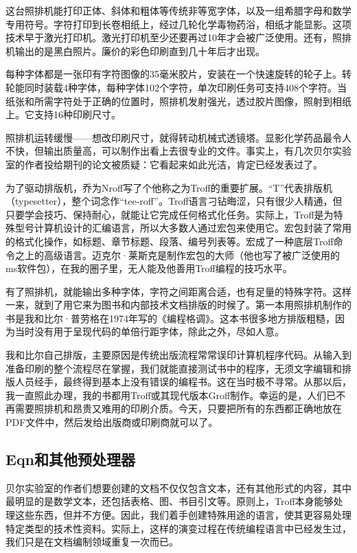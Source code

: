 \documentclass[a4paper,12pt,UTF8,twoside]{ctexbook}
\begin{document}
这台照排机能打印正体、斜体和粗体等传统非等宽字体，以及一组希腊字母和数学专用符号。字符打印到长卷相纸上，经过几轮化学毒物药浴，相纸才能显影。这项技术早于激光打印机。激光打印机至少还要再过10年才会被广泛使用。还有，照排机输出的是黑白照片。廉价的彩色印刷直到几十年后才出现。

每种字体都是一张印有字符图像的35毫米胶片，安装在一个快速旋转的轮子上。转轮能同时装载4种字体，每种字体102个字符，单次印刷任务可支持408个字符。当纸张和所需字符处于正确的位置时，照排机发射强光，透过胶片图像，照射到相纸上。它支持16种印刷尺寸。

照排机运转缓慢——想改印刷尺寸，就得转动机械式透镜塔。显影化学药品最令人不快，但输出质量高，可以制作出看上去很专业的文件。事实上，有几次贝尔实验室的作者投给期刊的论文被质疑：它看起来如此光洁，肯定已经发表过了。

为了驱动排版机，乔为Nroff写了个他称之为Troff的重要扩展。“T”代表排版机（typesetter），整个词念作“tee-roff”。Troff语言刁钻晦涩，只有很少人精通，但只要学会技巧、保持耐心，就能让它完成任何格式化任务。实际上，Troff是为特殊型号计算机设计的汇编语言，所以大多数人通过宏包来使用它。宏包封装了常用的格式化操作，如标题、章节标题、段落、编号列表等。宏成了一种底层Troff命令之上的高级语言。迈克尔·莱斯克是制作宏包的大师（他也写了被广泛使用的ms软件包），在我的圈子里，无人能及他善用Troff编程的技巧水平。

有了照排机，就能输出多种字体，字符之间距离合适，也有足量的特殊字符。这样一来，就到了用它来为图书和内部技术文档排版的时候了。第一本用照排机制作的书是我和比尔·普劳格在1974年写的《编程格调》。这本书很多地方排版粗糙，因为当时没有用于呈现代码的单倍行距字体，除此之外，尽如人意。

我和比尔自己排版，主要原因是传统出版流程常常误印计算机程序代码。从输入到准备印刷的整个流程尽在掌握，我们就能直接测试书中的程序，无须文字编辑和排版人员经手，最终得到基本上没有错误的编程书。这在当时极不寻常。从那以后，我一直照此办理，我的书都用Troff或其现代版本Groff制作。幸运的是，人们已不再需要照排机和昂贵又难用的印刷介质。今天，只要把所有的东西都正确地放在PDF文件中，然后发给出版商或印刷商就可以了。

\subsection{Eqn和其他预处理器}

贝尔实验室的作者们想要创建的文档不仅仅包含文本，还有其他形式的内容，其中最明显的是数学文本，还包括表格、图、书目引文等。原则上，Troff本身能够处理这些东西，但并不方便。因此，我们着手创建特殊用途的语言，使其更容易处理特定类型的技术性资料。实际上，这样的演变过程在传统编程语言中已经发生过，我们只是在文档编制领域重复一次而已。
\end{document}
